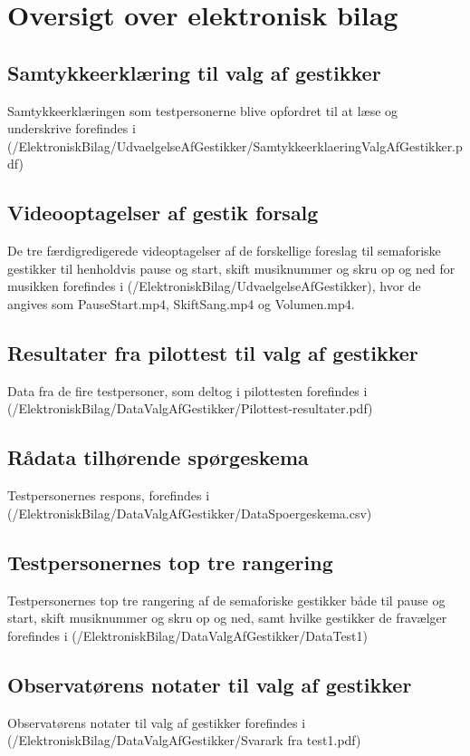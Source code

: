 \chapter{Oversigt over elektronisk bilag}
\label{app:OversigtOverElektroniskBilag}
%
%
\section{Samtykkeerklæring til valg af gestikker}
\label{app:SamtykkeerklaeringValgAfGestikker}
%
Samtykkeerklæringen som testpersonerne blive opfordret til at læse og underskrive forefindes i (/ElektroniskBilag/UdvaelgelseAfGestikker/SamtykkeerklaeringValgAfGestikker.pdf)
%
\section{Videooptagelser af gestik forsalg}
\label{app:VideooptagelseGestikForslag}
%
De tre færdigredigerede videoptagelser af de forskellige foreslag til semaforiske gestikker til henholdvis pause og start, skift musiknummer og skru op og ned for musikken forefindes i (/ElektroniskBilag/UdvaelgelseAfGestikker), hvor de angives som PauseStart.mp4, SkiftSang.mp4 og Volumen.mp4.
%
\section{Resultater fra pilottest til valg af gestikker}
\label{app:ResultaterPilottestValgAfGestikker}
%
Data fra de fire testpersoner, som deltog i pilottesten forefindes i \\
(/ElektroniskBilag/DataValgAfGestikker/Pilottest-resultater.pdf)
%
\section{Rådata tilhørende spørgeskema}
\label{app:RaaDataSpoergeskema}
%
Testpersonernes respons, forefindes i (/ElektroniskBilag/DataValgAfGestikker/DataSpoergeskema.csv)
%
\section{Testpersonernes top tre rangering}
\label{app:TestpersonernesTopTre}
%
Testpersonernes top tre rangering af de semaforiske gestikker både til pause og start, skift musiknummer og skru op og ned, samt hvilke gestikker de fravælger forefindes i (/ElektroniskBilag/DataValgAfGestikker/DataTest1)
%
\section{Observatørens notater til valg af gestikker}
\label{app:NoterValgAfGestikker}
%
Observatørens notater til valg af gestikker forefindes i (/ElektroniskBilag/DataValgAfGestikker/Svarark fra test1.pdf)
%
